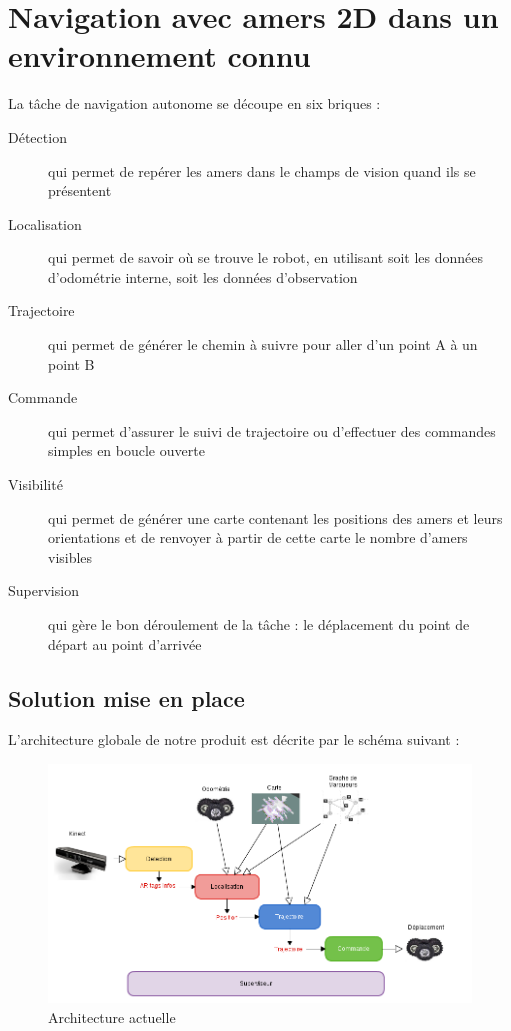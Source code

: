 \documentclass[10pt,a4paper]{article}
\begin{document}
\section{Navigation avec amers 2D dans un environnement connu}
\label{sec:navigation_avec_amers_2D_dans_un_environnement_connu}

La tâche de navigation autonome se découpe en six briques : 
\begin{description}
\item [Détection] qui permet de repérer les amers dans le champs de vision quand ils se présentent 
\item [Localisation] qui permet de savoir où se trouve le robot, en utilisant soit les données d'odométrie interne, soit les données d'observation
\item [Trajectoire] qui permet de générer le chemin à suivre pour aller d'un point A à un point B
\item [Commande] qui permet d'assurer le suivi de trajectoire ou d'effectuer des commandes simples en boucle ouverte
\item [Visibilité] qui permet de générer une carte contenant les positions des amers et leurs orientations et de renvoyer à partir de cette carte le nombre d'amers visibles 
\item [Supervision] qui gère le bon déroulement de la tâche : le déplacement du point de départ au point d'arrivée 
\end{description}



\subsection{Solution mise en place}
\label{sec:solution_mise_en_place}

L'architecture globale de notre produit est décrite par le schéma suivant :

\begin{figure}[h]
\center
\includegraphics[scale=0.5]{figures/archi.png} 
\caption{Architecture actuelle}	
\end{figure}
\end{document}
